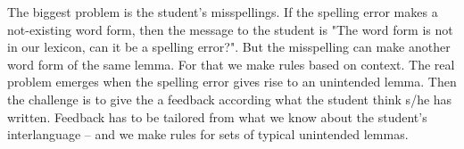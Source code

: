 \documentclass[11pt]{article}
\begin{document}
%
%
%

The biggest problem is the student's misspellings. If the spelling error makes a not-existing word form, then the message to the student is "The word form is not in our lexicon, can it be a spelling error?". But the misspelling can make another word form of the same lemma. For that we make rules based on context. The real problem emerges when the spelling error gives rise to an unintended lemma. Then the challenge is to give the a feedback according what the student think s/he has written. Feedback has to be tailored from what we know about the student’s interlanguage – and we make rules for sets of typical unintended lemmas.
\end{document}
